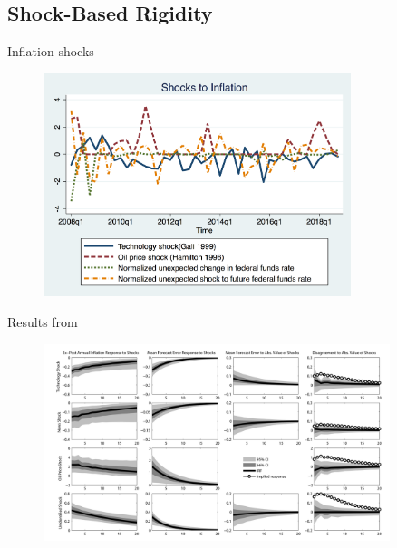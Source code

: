 \documentclass{beamer}
\begin{document}
\subsection{Shock-Based Rigidity}

\begin{frame}{Inflation shocks}

\begin{figure}
	\includegraphics[width=0.8\textwidth]{figuresDraft/inf_shocksQ.png} 
\end{figure}

\end{frame}

\begin{frame}{Results from \citet{coibion2012can}}

\begin{figure}
	\includegraphics[width=0.9\textwidth]{figuresDraft/RigidityJPEFigure2.png} 
\end{figure}

\end{frame}
\end{document}
